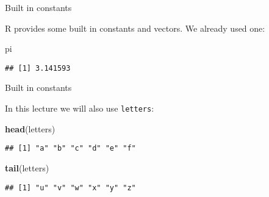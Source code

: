 \documentclass[ignorenonframetext,]{beamer}
\newenvironment{Shaded}{\begin{snugshade}}{\end{snugshade}}
\newcommand{\KeywordTok}[1]{\textcolor[rgb]{0.13,0.29,0.53}{\textbf{#1}}}
\newcommand{\NormalTok}[1]{#1}
\begin{document}
\begin{frame}[fragile]{Built in constants}
\protect\hypertarget{built-in-constants}{}

R provides some built in constants and vectors. We already used one:

\begin{Shaded}
\begin{Highlighting}[]
\NormalTok{pi}
\end{Highlighting}
\end{Shaded}

\begin{verbatim}
## [1] 3.141593
\end{verbatim}

\end{frame}

\begin{frame}[fragile]{Built in constants}
\protect\hypertarget{built-in-constants-1}{}

In this lecture we will also use \texttt{letters}:

\begin{Shaded}
\begin{Highlighting}[]
\KeywordTok{head}\NormalTok{(letters)}
\end{Highlighting}
\end{Shaded}

\begin{verbatim}
## [1] "a" "b" "c" "d" "e" "f"
\end{verbatim}

\begin{Shaded}
\begin{Highlighting}[]
\KeywordTok{tail}\NormalTok{(letters)}
\end{Highlighting}
\end{Shaded}

\begin{verbatim}
## [1] "u" "v" "w" "x" "y" "z"
\end{verbatim}

\end{frame}
\end{document}
